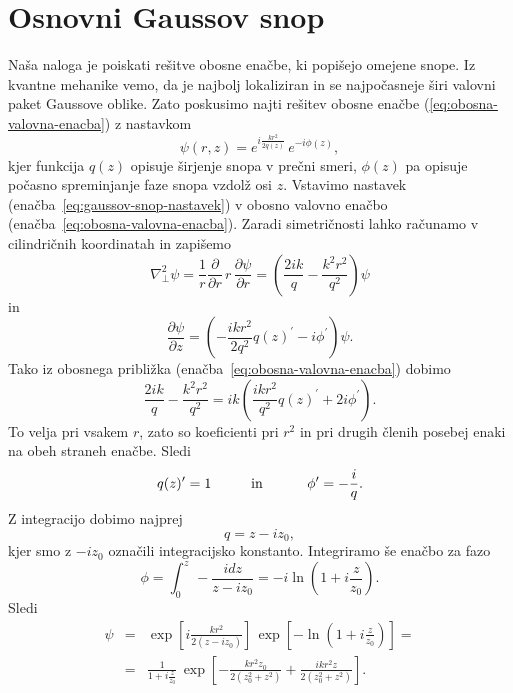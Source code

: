 \section{Osnovni Gaussov snop}
Naša naloga je poiskati rešitve obosne enačbe, ki popišejo omejene
snope. Iz kvantne mehanike vemo, da je najbolj lokaliziran in se najpočasneje
širi valovni paket Gaussove oblike. Zato poskusimo najti rešitev obosne
enačbe (\ref{eq:obosna-valovna-enacba}) z nastavkom
\begin{equation}
\psi(r,z)=e^{i\frac{kr^{2}}{2q(z)}}\, e^{-i\phi(z)},\label{eq:gaussov-snop-nastavek}
\end{equation}
kjer funkcija $q(z)$ opisuje širjenje snopa v prečni smeri,
$\phi(z)$ pa opisuje počasno spreminjanje faze snopa vzdolž osi $z$.
Vstavimo nastavek (enačba~\ref{eq:gaussov-snop-nastavek}) v obosno valovno enačbo 
(enačba~\ref{eq:obosna-valovna-enacba}).
Zaradi simetričnosti lahko računamo v cilindričnih koordinatah in zapišemo
\begin{equation}
\nabla_{\perp}^{2}\psi=\frac{1}{r}\frac{\partial}{\partial r}\, r\,\frac{\partial\psi}{\partial r}=
\left( \frac{2ik}{q}-\frac{k^2r^2}{q^2}\right)\psi
\end{equation}
 in 
\begin{equation}
\frac{\partial\psi}{\partial z}=\left(-\frac{ikr^{2}}{2q^2}q(z)^{\prime}-i\phi^{\prime}\right)\psi.
\end{equation}
Tako iz obosnega približka (enačba~\ref{eq:obosna-valovna-enacba}) dobimo
\begin{equation}
\frac{2ik}{q}-\frac{k^2r^2}{q^2}=ik\left(\frac{ikr^{2}}{q^2}q(z)^{\prime}+2i\phi^{\prime}\right).
\end{equation}
To velja pri vsakem $r$, zato so koeficienti
pri $r^{2}$ in pri drugih členih posebej enaki na obeh straneh enačbe. Sledi
\begin{equation}
q(z)^{\prime}=1\mbox{\hskip1cm in \hskip1cm}\phi^{\prime}=-\frac{i}{q}.
\end{equation}
 Z integracijo dobimo najprej 
\begin{equation}
q=z-iz_{0},
\label{eq:alpha}
\end{equation}
kjer smo z $-i z_{0}$ označili integracijsko konstanto. 
Integriramo še enačbo za fazo 
\begin{equation}
\phi=\int_{0}^{z}\,-\frac{i dz}{z-iz_{0}}=-i\ln(1+i\frac{z}{z_{0}}).
\end{equation}
Sledi
\begin{eqnarray}
\psi & = & \exp\left[i\frac{kr^{2}}{2(z-iz_0)}\right]\,\exp\left[-\ln(1+i\frac{z}{z_{0}})\right]=
\nonumber \\
 & = & \frac{1}{1+i\frac{z}{z_{0}}}\,\exp\left[-\frac{kr^{2}z_{0}}{2(z_{0}^{2}+z^{2})}+
 \frac{ikr^{2}z}{2(z_{0}^{2}+z^{2})}\right].
 \label{eq:gaussov-snop-vmesni}
\end{eqnarray}
